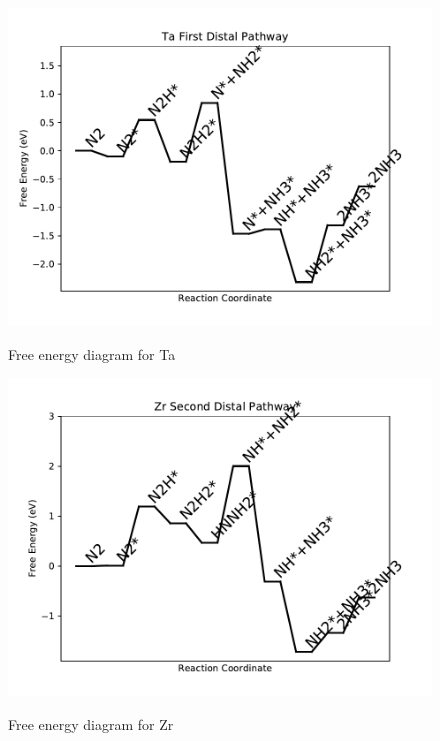\documentclass{article}
\begin{document}
\begin{figure}
\includegraphics[width=1\linewidth]{data/plots/Ta_distal_1.pdf}
\label{fig:Ta_distal_1}
\caption{Free energy diagram for Ta}
\end{figure}

\clearpage
\begin{figure}
\includegraphics[width=1\linewidth]{data/plots/Zr_distal_2.pdf}
\label{fig:Zr_distal_2}
\caption{Free energy diagram for Zr}
\end{figure}
\end{document}
